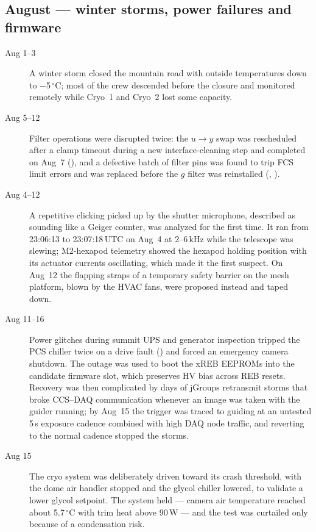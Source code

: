\subsection{August --- winter storms, power failures and firmware}
\begin{description}
\item[Aug 1--3] A winter storm closed the mountain road with outside
  temperatures down to $-$5\,$^{\circ}$C; most of the crew descended
  before the closure and monitored remotely while Cryo~1 and Cryo~2
  lost some capacity.

\item[Aug 5--12] Filter operations were disrupted twice: the $u \to y$
  swap was rescheduled after a clamp timeout during a new
  interface-cleaning step and completed on Aug~7 (), and a
  defective batch of filter pins was found to trip FCS limit errors
  and was replaced before the $g$ filter was reinstalled
  (, ).

\item[Aug 4--12] A repetitive clicking picked up by the shutter
  microphone, described as sounding like a Geiger counter, was analyzed
  for the first time.  It ran from 23:06:13 to 23:07:18\,UTC on Aug~4 at
  2--6\,kHz while the telescope was slewing; M2-hexapod telemetry showed
  the hexapod holding position with its actuator currents oscillating,
  which made it the first suspect.  On Aug~12 the flapping straps of a
  temporary safety barrier on the mesh platform, blown by the HVAC fans,
  were proposed instead and taped down.

\item[Aug 11--16] Power glitches during summit UPS and generator
  inspection tripped the PCS chiller twice on a drive fault
  () and forced an emergency camera shutdown.  The outage was
  used to boot the xREB EEPROMs into the candidate firmware slot, which
  preserves HV bias across REB resets.  Recovery was then complicated
  by days of jGroups retransmit storms that broke CCS--DAQ
  communication whenever an image was taken with the guider running;
  by Aug~15 the trigger was traced to guiding at an untested 5\,s
  exposure cadence combined with high DAQ node traffic, and reverting
  to the normal cadence stopped the storms.

\item[Aug 15] The cryo system was deliberately driven toward its
  crash threshold, with the dome air handler stopped and the glycol
  chiller lowered, to validate a lower glycol setpoint.  The system
  held --- camera air temperature reached about 5.7\,$^{\circ}$C with
  trim heat above 90\,W --- and the test was curtailed only because of
  a condensation risk.


\end{description}
